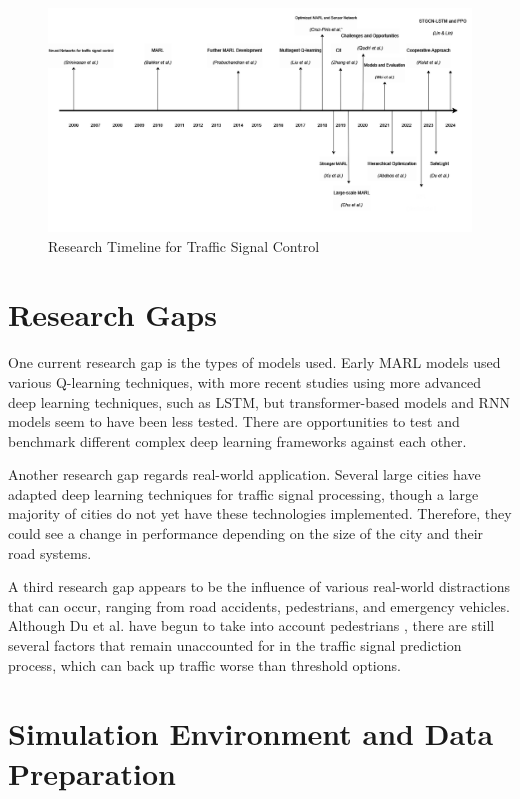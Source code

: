 \documentclass[conference]{IEEEtran}
\begin{document}
\begin{figure}[H]
    \centering
    \includegraphics[width=0.9\linewidth]{Diagram Timeline.png}
    \caption{Research Timeline for Traffic Signal Control}
\end{figure}

\section{Research Gaps}
One current research gap is the types of models used. Early MARL models used various Q-learning techniques, with more recent studies using more advanced deep learning techniques, such as LSTM, but transformer-based models and RNN models seem to have been less tested. There are opportunities to test and benchmark different complex deep learning frameworks against each other. 

Another research gap regards real-world application. Several large cities have adapted deep learning techniques for traffic signal processing, though a large majority of cities do not yet have these technologies implemented. Therefore, they could see a change in performance depending on the size of the city and their road systems. 

A third research gap appears to be the influence of various real-world distractions that can occur, ranging from road accidents, pedestrians, and emergency vehicles. Although Du et al. have begun to take into account pedestrians \cite{13}, there are still several factors that remain unaccounted for in the traffic signal prediction process, which can back up traffic worse than threshold options.

\section{Simulation Environment and Data Preparation}
\end{document}
